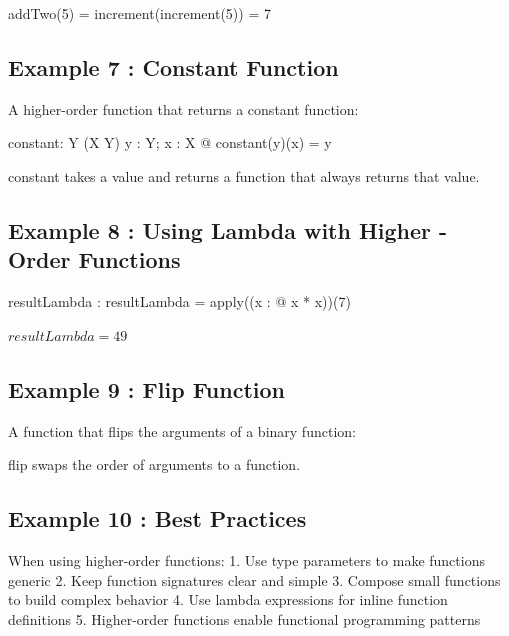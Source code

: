 \documentclass[a4paper,10pt,fleqn]{article}
\begin{document}
\noindent addTwo(5) = increment(increment(5)) = 7

\bigskip

\subsection*{Example 7 : Constant Function}

\noindent A higher-order function that returns a constant function:

\bigskip

\begin{gendef}[X, Y]
  constant: Y \fun (X \fun Y)
\where
  \forall y : Y; x : X @ constant(y)(x) = y
\end{gendef}

\noindent constant takes a value and returns a function that always returns that value.

\bigskip

\subsection*{Example 8 : Using Lambda with Higher - Order Functions}

\begin{axdef}
resultLambda : \nat
\where
resultLambda = apply((\lambda x : \nat @ x * x))(7)
\end{axdef}

\noindent $resultLambda = 49$

\bigskip

\subsection*{Example 9 : Flip Function}

\noindent A function that flips the arguments of a binary function:

\bigskip


\noindent flip swaps the order of arguments to a function.

\bigskip

\subsection*{Example 10 : Best Practices}

\noindent When using higher-order functions: 1. Use type parameters to make functions generic 2. Keep function signatures clear and simple 3. Compose small functions to build complex behavior 4. Use lambda expressions for inline function definitions 5. Higher-order functions enable functional programming patterns

\bigskip
\end{document}
